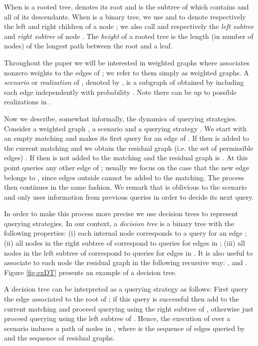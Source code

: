 \documentclass[12pt]{article}
\begin{document}
	  When  is a rooted tree,  denotes its root and  is the subtree of  which contains  and all of its descendants. When  is a binary tree, we use  and  to denote respectively the left and right children of a node ; we also call  and  respectively the \emph{left subtree} and \emph{right subtree} of node . The \emph{height} of a rooted tree is the length (in number of nodes) of the longest path between the root and a leaf.
	
	 Throughout the paper we will be interested in weighted graphs  where  associates nonzero weights to the edges of ; we refer to them simply as weighted graphs. A \emph{scenario} or \emph{realization}  of , denoted by , is a subgraph of  obtained by including each edge  independently with probability . Note there can be up to  possible realizations in .

		Now we describe, somewhat informally, the dynamics of querying strategies. Consider a weighted graph , a scenario  and a querying strategy . We start with an empty matching and  makes its first query for an edge  of . If  then  is added to the current matching and we obtain the residual graph (i.e. the set of permissible edges) . If  then  is not added to the matching and the residual graph is . At this point  queries any other edge of ; usually we focus on the case that the new edge belongs to , since edges outside  cannot be added to the matching. The process then continues in the same fashion. We remark that  is oblivious to the scenario  and only uses information from previous queries in order to decide its next query.
				
	  In order to make this process more precise we use decision trees to represent querying strategies. In our context, a \emph{decision tree}  is a binary tree with the following properties: (i) each internal node  corresponds to a query for an edge ; (ii) all nodes in the right subtree of  correspond to queries for edges in ; (iii) all nodes in the left subtree of  correspond to queries for edges in .
It is also useful to associate to each node  the residual graph  in the following recursive way: ,  and . Figure \ref{fig:exDT} presents an example of a decision tree.
	  
	A decision tree  can be interpreted as a querying strategy as follows: First query the edge  associated to the root of ; if this query is successful then add  to the current matching and proceed querying using the right subtree of , otherwise just proceed querying using the left subtree of . Hence, the execution of  over a scenario  induces a path of nodes  in , where  is the sequence of edges queried by  and  the sequence of residual graphs. 
	
\end{document}
